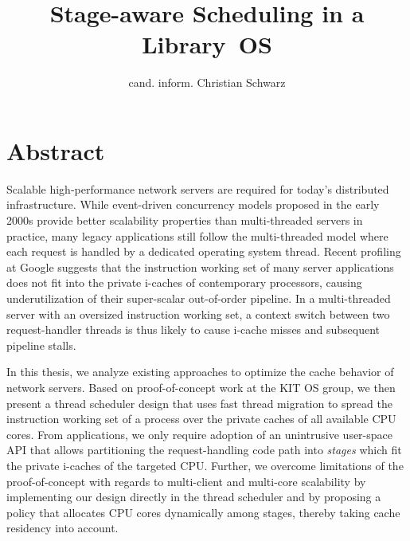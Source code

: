 \documentclass[12pt,a4paper]{book}
\begin{document}
\frontmatter
{}

\title{Stage-aware Scheduling in a Library~OS}
\author{cand. inform. Christian Schwarz}
\maketitle



\chapter{Abstract}
Scalable high-performance network servers are required for today's distributed infrastructure.
While event-driven concurrency models proposed in the early 2000s provide better scalability properties than multi-threaded servers in practice,
many legacy applications still follow the multi-threaded model where each request is handled by a dedicated operating system thread.
Recent profiling at Google suggests that the instruction working set of many server applications does not fit into the private i-caches of contemporary processors, causing underutilization of their super-scalar out-of-order pipeline.
In a multi-threaded server with an oversized instruction working set, a context switch between two request-handler threads is thus likely to cause i-cache misses and subsequent pipeline stalls.

In this thesis, we analyze existing approaches to optimize the cache behavior of network servers.
Based on proof-of-concept work at the KIT OS group, we then present a thread scheduler design that uses fast thread migration to spread the instruction working set of a process over the private caches of all available CPU cores.
From applications, we only require adoption of an unintrusive user-space API that allows partitioning the request-handling code path into \emph{stages} which fit the private i-caches of the targeted CPU.
Further, we overcome limitations of the proof-of-concept with regards to multi-client and multi-core scalability by implementing our design directly in the thread scheduler and by proposing a policy that allocates CPU cores dynamically among stages, thereby taking cache residency into account.
\end{document}
